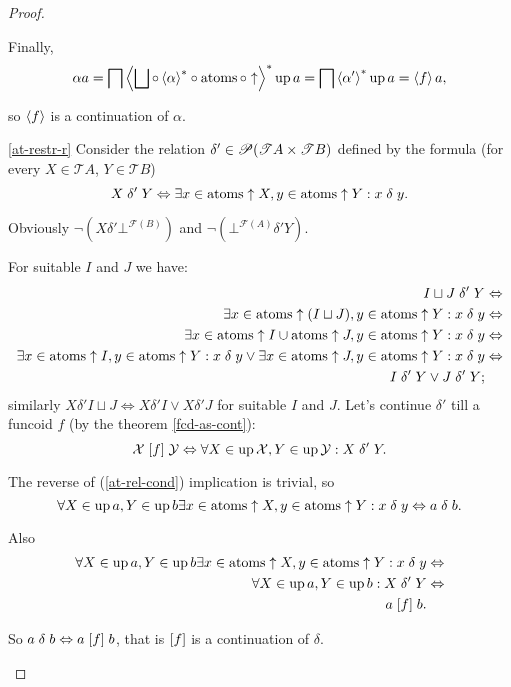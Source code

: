 \begin{proof}
\begin{widedisorder}
Finally,
\[
\alpha
a=\bigsqcap\rsupfun{\bigsqcup\circ\rsupfun{\alpha}\circ\atoms\circ\uparrow}\up
a=\bigsqcap\rsupfun{\alpha'}\up a=\supfun fa,
\]



so $\left\langle f\right\rangle$ is a continuation of $\alpha$.

\item [{\ref{at-restr-r}}] Consider the relation
$\delta'\in\mathscr{P}(\mathscr{T}A\times\mathscr{T}B)$
defined by the formula (for every $X\in\mathscr{T}A$, $Y\in\mathscr{T}B$)
\[
X\mathrel{\delta'}Y\Leftrightarrow\exists x\in\operatorname{atoms}\uparrow
X,y\in\operatorname{atoms}\uparrow Y:x\mathrel\delta y.
\]



Obviously $\lnot(X\mathrel{\delta'}\bot^{\mathscr{F}(B)})$ and
$\lnot(\bot^{\mathscr{F}(A)}\mathrel{\delta'}Y)$.


For suitable $I$ and $J$ we have:
\begin{align*}
I\sqcup J\mathrel{\delta'}Y & \Leftrightarrow\\
\exists x\in\operatorname{atoms}\uparrow(I\sqcup J),y\in\operatorname{atoms}\uparrow Y:x\mathrel\delta y &
\Leftrightarrow\\
\exists x\in\operatorname{atoms}\uparrow I\cup\operatorname{atoms}\uparrow J,y\in\operatorname{atoms}\uparrow
Y:x\mathrel\delta y & \Leftrightarrow\\
\exists x\in\operatorname{atoms}\uparrow I,y\in\operatorname{atoms}\uparrow Y:x\mathrel\delta y\lor\exists
x\in\operatorname{atoms}\uparrow J,y\in\operatorname{atoms}\uparrow Y:x\mathrel\delta y & \Leftrightarrow\\
I\mathrel{\delta'}Y\lor J\mathrel{\delta'}Y;
\end{align*}
similarly $X\mathrel{\delta'}I\sqcup J\Leftrightarrow X\mathrel{\delta'}I\lor
X\mathrel{\delta'}J$
for suitable $I$ and $J$. Let's continue $\delta'$ till a funcoid
$f$ (by the theorem \ref{fcd-as-cont}):
\[
\mathcal{X}\mathrel{\left[f\right]}\mathcal{Y}\Leftrightarrow\forall
X\in\operatorname{up}\mathcal{X},Y\in\operatorname{up}\mathcal{Y}:X\mathrel{\delta'}Y.
\]



The reverse of (\ref{at-rel-cond}) implication is trivial, so
\[
\forall X\in\operatorname{up} a,Y\in\operatorname{up} b\exists x\in\operatorname{atoms}\uparrow X,y\in\operatorname{atoms}\uparrow
Y:x\mathrel\delta y\Leftrightarrow a\mathrel\delta b.
\]



Also
\begin{align*}
\forall X\in\operatorname{up} a,Y\in\operatorname{up} b\exists x\in\operatorname{atoms}\uparrow X,y\in\operatorname{atoms}\uparrow
Y:x\mathrel\delta y & \Leftrightarrow\\
\forall X\in\operatorname{up} a,Y\in\operatorname{up} b:X\mathrel{\delta'}Y & \Leftrightarrow\\
a\mathrel{\left[f\right]}b.
\end{align*}



So $a\mathrel\delta b\Leftrightarrow a\mathrel{\left[f\right]}b$, that is $\mathrel{\left[f\right]}$
is a continuation of $\delta$.

\end{widedisorder}
\end{proof}
